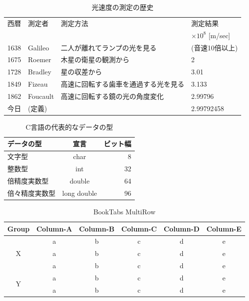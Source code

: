 \begin{table}[htbp]
 \caption{光速度の測定の歴史}
 \label{tb:SpeedOfLight}
 \centering
  \begin{tabular}{clll}
   \hline
   西暦 & 測定者 & 測定方法 & 測定結果 \\
    & & & $\times 10^8$ [m/sec] \\
   \hline \hline
   1638 & Galileo & 二人が離れてランプの光を見る & (音速10倍以上) \\
   1675 & Roemer & 木星の衛星の観測から & 2 \\
   1728 & Bradley & 星の収差から & 3.01 \\
   1849 & Fizeau & 高速に回転する歯車を通過する光を見る & 3.133 \\
   1862 & Foucault & 高速に回転する鏡の光の角度変化 & 2.99796 \\
   今日 & (定義) & & 2.99792458 \\
   \hline
  \end{tabular}
\end{table}

\begin{table}[htbp]
  \caption{C言語の代表的なデータの型}
  \label{tb:data_type}
  \centering
  \begin{tabular}{lcr}
    \hline
    データの型  & 宣言  &  ビット幅  \\
    \hline \hline
    文字型  & char  & 8 \\
    整数型  & int   & 32 \\
    倍精度実数型  & double  & 64 \\
    倍々精度実数型  &  long double  &  96 \\
    \hline
  \end{tabular}
\end{table}

\begin{table}
    \centering
    \caption{BookTabs MultiRow}
    \begin{tabular}{cccccc}
        \toprule
        Group              & Column-A & Column-B & Column-C & Column-D & Column-E \\
        \midrule
        \multirow{3}{*}{X} & a        & b        & c        & d        & e        \\
                           & a        & b        & c        & d        & e        \\
                           & a        & b        & c        & d        & e        \\
        \midrule
        \multirow{2}{*}{Y} & a        & b        & c        & d        & e        \\
                           & a        & b        & c        & d        & e        \\
        \bottomrule
    \end{tabular}
\end{table}

